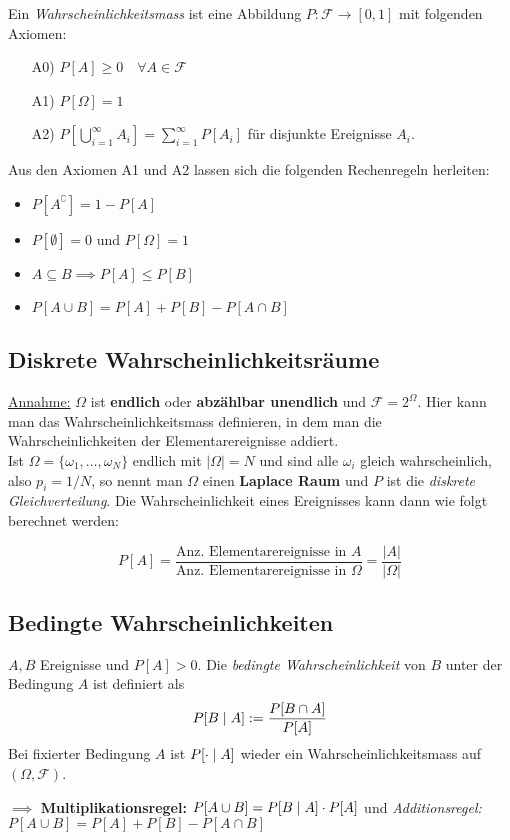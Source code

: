 \begin{definition}
Ein \textit{Wahrscheinlichkeitsmass} ist eine Abbildung $P: \mathcal{F}\to [0,1]$ mit folgenden Axiomen:
\begin{itemize}
\item[A0)] $P[A] \geq 0 \quad \forall A\in \mathcal{F}$
\item[A1)] $P[\Omega] = 1$
\item[A2)] $P\left[\bigcup_{i=1}^\infty A_i\right] = \sum_{i=1}^\infty P[A_i]$ für disjunkte Ereignisse $A_i$.
\end{itemize}
\end{definition}
Aus den Axiomen A1 und A2 lassen sich die folgenden Rechenregeln herleiten:
\begin{itemize}
\item $P[A^\complement] = 1 - P[A]$
\item $P[\emptyset] = 0$ und $P[\Omega] = 1$
\item $A \subseteq B \implies P[A] \leq P[B]$
\item $P[A \cup B] = P[A] + P[B] - P[A\cap B]$
\end{itemize}

\subsection{Diskrete Wahrscheinlichkeitsräume}
\underline{Annahme:} $\Omega$ ist \textbf{endlich} oder \textbf{abzählbar unendlich} und $\mathcal{F}=2^\Omega$. Hier kann man das Wahrscheinlichkeitsmass definieren, in dem man die Wahrscheinlichkeiten der Elementarereignisse addiert.\\

Ist $\Omega = \{\omega_1, \dots, \omega_N\}$ endlich mit $|\Omega| = N$ und sind alle $\omega_i$ gleich wahrscheinlich, also $p_i = 1/N$, so nennt man $\Omega$ einen \textbf{Laplace Raum} und $P$ ist die \textit{diskrete Gleichverteilung}. Die Wahrscheinlichkeit eines Ereignisses kann dann wie folgt berechnet werden:

$$ P[A] = \frac{\mbox{Anz. Elementarereignisse in } A}{\mbox{Anz. Elementarereignisse in } \Omega} = \frac{|A|}{|\Omega|}$$

\subsection{Bedingte Wahrscheinlichkeiten}
\begin{definition}
$A,B$ Ereignisse und $P[A] > 0$. Die \textit{bedingte Wahrscheinlichkeit} von $B$ unter der Bedingung $A$ ist definiert als
$$ P[B \;|\; A] := \frac{P[B \cap A ]}{P[A]}$$
Bei fixierter Bedingung $A$ ist $P[\cdot \;|\; A]$ wieder ein Wahrscheinlichkeitsmass auf $(\Omega, \mathcal{F})$.
\end{definition}
$\implies$ \textbf{Multiplikationsregel:} $P[A\cup B] = P[B \;|\; A] \cdot P[A]$ und \textit{Additionsregel:} $P[A\cup B] = P[A] + P[B] - P[A\cap B]$

